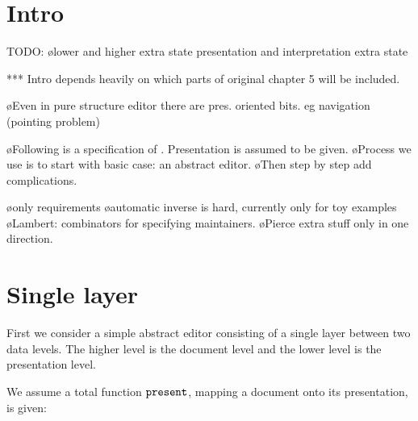 %																
%																
%																


%																
%																
%																
\section{Intro}

\toHere
TODO:
\bl
\o lower and higher extra state \rarr presentation and interpretation extra state
\el

*** Intro depends heavily on which parts of original chapter 5 will be included.


\bl
\o Even in pure structure editor there are pres. oriented bits. eg navigation (pointing problem)
\el

\bl
\o Following is a specification of \interpret. Presentation is assumed to be given.
\o Process we use is to start with basic case: an abstract editor. 
\o Then step by step add complications.
\el

\bl
\o only requirements
\o automatic inverse is hard, currently only for toy examples
\o Lambert: combinators for specifying maintainers. 
\o Pierce  extra stuff only in one direction.
\el


\fromHere


%																
%																
%																
\section{Single layer} \label{sect:singleSimple}

First we consider a simple abstract editor consisting of a single layer between two data levels. The higher level is the document level and the lower level is the presentation level. 

We assume a total function ${\tt present}$, mapping a document onto its presentation, is given:

